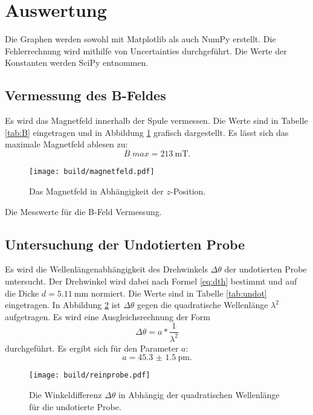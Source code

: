 \section{Auswertung}
\label{sec:Auswertung}

Die Graphen werden sowohl mit Matplotlib \cite{matplotlib} als auch NumPy \cite{numpy} erstellt. Die Fehlerrechnung wird mithilfe von Uncertainties \cite{uncertainties} durchgeführt. Die Werte der Konstanten werden SciPy \cite{scipy} entnommen.

\subsection{Vermessung des B-Feldes}
Es wird das Magnetfeld innerhalb der Spule vermessen. Die Werte sind in Tabelle \ref{tab:B} eingetragen und in Abbildung \ref{fig:B} grafisch dargestellt. Es lässt sich das maximale Magnetfeld ablesen zu:
\[
B_.{max}=\SI{213}{\milli\tesla}\text{.}
\]

\begin{figure}
	\centering
	\texttt{[image: build/magnetfeld.pdf]}
	\caption{Das Magnetfeld in Abhängigkeit der $z$-Position.}
	\label{fig:B}
\end{figure}

\begin{table}
	\centering
	\caption{Die Messwerte für die B-Feld Vermessung.}
	
	
	\label{tab:B}
\end{table}

\subsection{Untersuchung der Undotierten Probe}
Es wird die Wellenlängenabhängigkeit des Drehwinkels $\Delta\theta$ der undotierten Probe untersucht. Der Drehwinkel wird dabei nach Formel \eqref{eq:dth} bestimmt und auf die Dicke $d=\SI{5.11}{\milli\metre}$ normiert. Die Werte sind in Tabelle \ref{tab:undot} eingetragen. In Abbildung \ref{fig:undot} ist $\Delta\theta$ gegen die quadratische Wellenlänge $\lambda^2$ aufgetragen. Es wird eine Ausgleichsrechnung der Form 
\[
\Delta\theta = a*\frac{1}{\lambda^2} 
\]
durchgeführt. Es ergibt sich für den Parameter $a$:
\[
a = \SI{45.3(15)}{\pico\metre}\text{.}
\]
\begin{figure}
	\centering
	\texttt{[image: build/reinprobe.pdf]}
	\caption{Die Winkeldifferenz $\Delta\theta$ in Abhängig der quadratischen Wellenlänge für die undotierte Probe.}
	\label{fig:undot}
\end{figure}

